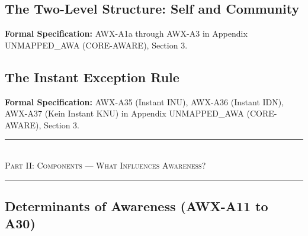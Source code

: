 \subsection{The Two-Level Structure: Self and Community}
\label{subsec:11-5-two-level}



\begin{cross-reference}
\textbf{Formal Specification:} AWX-A1a through AWX-A3 in
Appendix UNMAPPED_AWA (CORE-AWARE), Section 3.
\end{cross-reference}

\subsection{The Instant Exception Rule}
\label{subsec:11-6-instant-exception}



\begin{cross-reference}
\textbf{Formal Specification:} AWX-A35 (Instant INU), AWX-A36 (Instant IDN),
AWX-A37 (Kein Instant KNU) in Appendix UNMAPPED_AWA (CORE-AWARE), Section 3.
\end{cross-reference}



\begin{center}
\rule{0.8\textwidth}{0.4pt}\\[0.5em]
{\large\textsc{Part II: Components --- What Influences Awareness?}}\\[0.3em]
\rule{0.8\textwidth}{0.4pt}
\end{center}

\subsection{Determinants of Awareness (AWX-A11 to A30)}
\label{subsec:11-7-determinants}

